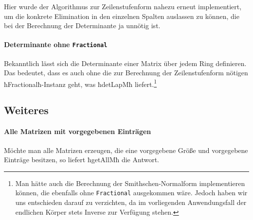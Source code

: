 Hier wurde der Algorithmus zur Zeilenstufenform nahezu erneut implementiert, um
die konkrete Elimination in den einzelnen Spalten auslassen zu können, die bei
der Berechnung der Determinante ja unnötig ist.

\paragraph{Determinante ohne \lstinline{Fractional}} Bekanntlich lässt sich die
Determinante einer Matrix über jedem Ring definieren. Das bedeutet, dass es
auch ohne die zur Berechnung der Zeilenstufenform nötigen ħFractionalħ-Instanz
geht, was ħdetLapMħ liefert.\footnote{Man hätte auch die Berechnung der
Smithschen-Normalform implementieren können, die ebenfalls ohne
\lstinline{Fractional}
ausgekommen wäre. Jedoch haben wir uns entschieden darauf zu verzichten, da im
vorliegenden Anwendungsfall der endlichen Körper stets Inverse zur Verfügung
stehen.}



\subsection{Weiteres}

\paragraph{Alle Matrizen mit vorgegebenen Einträgen} Möchte man alle Matrizen
erzeugen, die eine vorgegebene Größe und vorgegebene Einträge besitzen, so
liefert ħgetAllMħ die Antwort.

